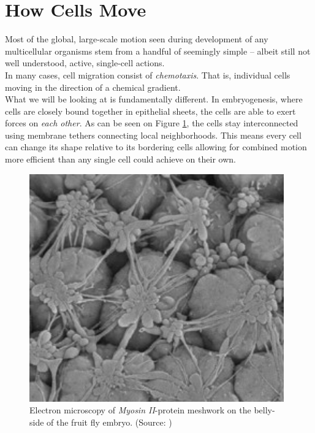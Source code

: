 \section{How Cells Move}
\label{sec:howmove}
Most of the global, large-scale motion seen during development of any multicellular organisms stem from a handful of seemingly simple -- albeit still not well understood, active, single-cell actions.\cite{walck2014cell}\\

In many cases, cell migration consist of \textit{chemotaxis}. That is, individual cells moving in the direction of a chemical gradient.\\
What we will be looking at is fundamentally different. In embryogenesis, where cells are closely bound together in epithelial sheets, the cells are able to exert forces on \textit{each other}. As can be seen on Figure \ref{fig:mysosinMeshwork}, the cells stay interconnected using membrane tethers connecting local neighborhoods. This means every cell can change its shape relative to its bordering cells allowing for combined motion more efficient than any single cell could achieve on their own.\cite{pare2020cellular}


\begin{figure}[H]
    \centering
    \includegraphics[width=0.6\linewidth]{chapters/Theory/figures/EM_constricting_proteins.png}
    \caption{Electron microscopy of\textit{ Myosin II}-protein meshwork on the belly-side of the fruit fly embryo. (Source: )}
    \label{fig:mysosinMeshwork}
\end{figure}


